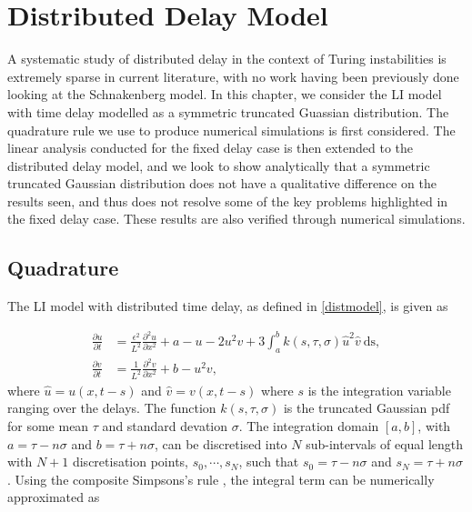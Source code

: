 \chapter{Distributed Delay Model}

A systematic study of distributed delay in the context of Turing instabilities is extremely sparse in current literature, with no work having been previously done looking at the Schnakenberg model. In this chapter, we consider the LI model with time delay modelled as a symmetric truncated Guassian distribution. The quadrature rule we use to produce numerical simulations is first considered. The linear analysis conducted for the fixed delay case is then extended to the distributed delay model, and we look to show analytically that a symmetric truncated Gaussian distribution does not have a qualitative difference on the results seen, and thus does not resolve some of the key problems highlighted in the fixed delay case. These results are also verified through numerical simulations.

\section{Quadrature}\label{section:quad}

The LI model with distributed time delay, as defined in \eqref{distmodel}, is given as

\begin{equation}\label{distmodel2}
  \begin{split}
    \frac{\partial u}{\partial t}&=\frac{\epsilon^2}{L^2}\frac{\partial^2u}{\partial x^2}+a-u-2u^2v+3\int_{a}^{b}k(s,\tau,\sigma)\hat{u}^2\hat{v} \ \text{ds},\\
    \frac{\partial v}{\partial t}&=\frac{1}{L^2}\frac{\partial^2v}{\partial x^2}+b-u^2v,
\end{split}
\end{equation}
where $\hat{u}=u(x,t-s)$ and $\hat{v}=v(x,t-s)$ where $s$ is the integration variable ranging over the delays. The function $k(s,\tau,\sigma)$ is the truncated Gaussian pdf for some mean $\tau$ and standard devation $\sigma$. The integration domain $[a, b]$, with $a=\tau-n\sigma$ and $b=\tau+n\sigma$, can be discretised into $N$ sub-intervals of equal length with $N+1$ discretisation points, $s_0,\cdots,s_{N}$, such that $s_0=\tau-n\sigma$ and $s_N=\tau+n\sigma$. Using the composite Simpsons's rule \cite{compsimp}, the integral term can be numerically approximated as


